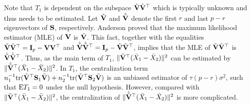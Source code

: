 \documentclass[times,sort&compress,3p]{elsarticle}
\newcommand{\mytr}{ {\rm tr} }
\newcommand{\myE}{ {\rm E} }
\theoremstyle{plain}
\theoremstyle{definition}
\theoremstyle{remark}
\begin{document}
Note that $T_1$ is dependent on the subspace $\tilde{\mathbf{V}}\tilde{\mathbf{V}}^\top $ which is typically unknown and thus needs to be estimated.
Let $\hat{\mathbf{V}}$ and $\hat{\tilde{\mathbf{V}}}$ denote the first $r$ and last $p-r$ eigenvectors of $\mathbf{S}$, respectively.
Anderson \cite{Anderson1986Asymptotic} proved that the maximum likelihood estimator (MLE) of $\mathbf{V}$ is $\hat{\mathbf{V}}$.
This fact, together with the equalities $\tilde{\mathbf{V}}\tilde{\mathbf{V}}^\top = \mathbf{I}_p-\mathbf{V}\mathbf{V}^\top $ and $\hat{\tilde{\mathbf{V}}}\hat{\tilde{\mathbf{V}}}^\top = \mathbf{I}_p-\hat{\mathbf{V}}\hat{\mathbf{V}}^\top $, implies that 
the MLE of $\tilde{\mathbf{V}}\tilde{\mathbf{V}}^\top $ is $\hat{\tilde{\mathbf{V}}}\hat{\tilde{\mathbf{V}}}^\top $.
Thus, as the main term of $T_1$,
$\|\tilde{\mathbf{V}}^\top  (\bar{X}_1-\bar{X}_2)\|^2$ can be estimated by $\|\hat{\tilde{\mathbf{V}}}^\top  (\bar{X}_1-\bar{X}_2)\|^2$.
In $T_1$, the centralization term $n_1^{-1}\mytr(\tilde{\BV}^\top  \BS_1\tilde{\BV})+n_2^{-1}\mytr(\tilde{\BV}^\top  \BS_2\tilde{\BV})$ is an unbiased estimator of $\tau (p-r)\sigma^2$, such that $\myE T_1=0$ under the null hypothesis.
However, compared with $\|\tilde{\mathbf{V}}^\top  (\bar{X}_1-\bar{X}_2)\|^2$, the centralization of $\|\hat{\tilde{\mathbf{V}}}^\top  (\bar{X}_1-\bar{X}_2)\|^2$ is more complicated.
\end{document}
